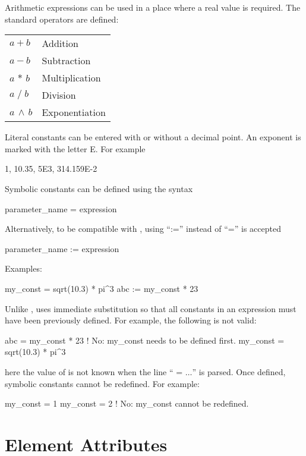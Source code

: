 Arithmetic expressions can be used in a place where a real value is required.
The standard operators are defined: \hfil\break
\hspace*{0.15in}
\begin{tabular}{ll}
  $a + b$           & Addition        \\
  $a - b$           & Subtraction     \\
  $a \, \ast \, b$  & Multiplication  \\
  $a \; / \; b$     & Division        \\
  $a \, \land \, b$ & Exponentiation  \\
\end{tabular}

Literal constants can be entered with or without a decimal point. An
exponent is marked with the letter E. For example
\begin{example}
  1, 10.35, 5E3, 314.159E-2
\end{example}
Symbolic constants can be defined using the syntax
\begin{example}
  parameter_name = expression
\end{example}
Alternatively, to be compatible with \MAD, using ``:='' instead of ``='' is accepted
\begin{example}
  parameter_name := expression
\end{example}
Examples:
\begin{example}
  my_const = sqrt(10.3) * pi^3
  abc     := my_const * 23
\end{example}
Unlike \MAD, \bmad uses immediate substitution so that all constants
in an expression must have been previously defined. For example, the
following is not valid:
\begin{example}
  abc      = my_const * 23      ! No: my_const needs to be defined first.
  my_const = sqrt(10.3) * pi^3
\end{example}
here the value of  is not known when the line ``
= $\ldots$'' is parsed. Once
defined, symbolic constants cannot be redefined. For example:
\begin{example}
  my_const = 1
  my_const = 2  ! No: my_const cannot be redefined.
\end{example}

\section{Element Attributes}

